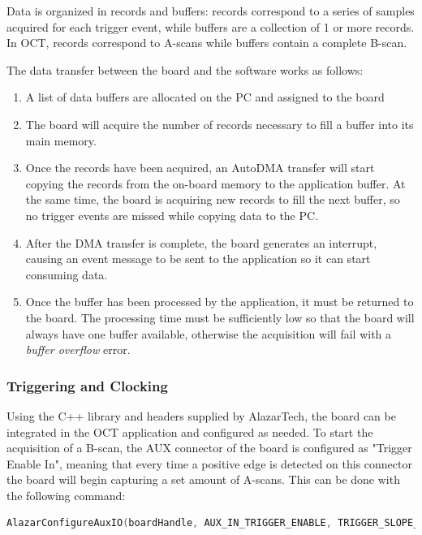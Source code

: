 Data is organized in records and buffers: records correspond to a series of samples acquired for each trigger event, while buffers are a collection of 1 or more records. In OCT, records correspond to A-scans while buffers contain a complete B-scan. 

The data transfer between the board and the software works as follows:
\begin{enumerate}
	\item A list of data buffers are allocated on the PC and assigned to the board

	\item The board will acquire the number of records necessary to fill a buffer into its main memory. 

	\item Once the records have been acquired, an AutoDMA transfer will start copying the records from the on-board memory to the application buffer. At the same time, the board is acquiring new records to fill the next buffer, so no trigger events are missed while copying data to the PC.

	\item After the DMA transfer is complete, the board generates an interrupt, causing an event message to be sent to the application so it can start consuming data. 
	
	\item Once the buffer has been processed by the application, it must be returned to the board. The processing time must be sufficiently low so that the board will always have one buffer available, otherwise the acquisition will fail with a \emph{buffer overflow} error.
\end{enumerate}


\subsubsection{Triggering and Clocking}
Using the C++ library and headers supplied by AlazarTech, the board can be integrated in the OCT application and configured as needed. To start the acquisition of a B-scan, the AUX connector of the board is configured as "Trigger Enable In", meaning that every time a positive edge is detected on this connector the board will begin capturing a set amount of A-scans. This can be done with the following command:

\begin{lstlisting}[language=C,frame=tb]
AlazarConfigureAuxIO(boardHandle, AUX_IN_TRIGGER_ENABLE, TRIGGER_SLOPE_POSITIVE);
\end{lstlisting}

